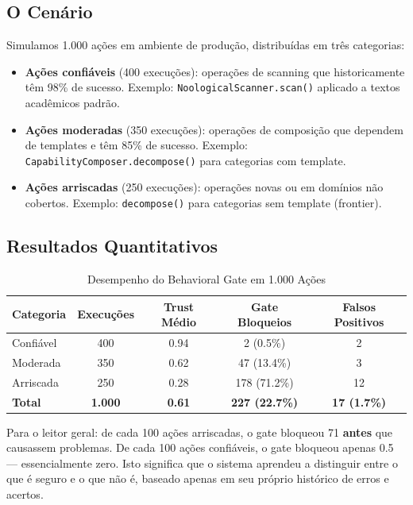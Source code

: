 \subsection{O Cenário}

Simulamos 1.000 ações em ambiente de produção, distribuídas em três categorias:

\begin{itemize}
    \item \textbf{Ações confiáveis} (400 execuções): operações de scanning que historicamente têm 98\% de sucesso. Exemplo: \texttt{NoologicalScanner.scan()} aplicado a textos acadêmicos padrão.
    \item \textbf{Ações moderadas} (350 execuções): operações de composição que dependem de templates e têm 85\% de sucesso. Exemplo: \texttt{CapabilityComposer.decompose()} para categorias com template.
    \item \textbf{Ações arriscadas} (250 execuções): operações novas ou em domínios não cobertos. Exemplo: \texttt{decompose()} para categorias sem template (frontier).
\end{itemize}

\subsection{Resultados Quantitativos}

\begin{table}[H]
\centering
\small
\caption{Desempenho do Behavioral Gate em 1.000 Ações}
\label{tab:gate_performance}
\begin{tabular}{lcccc}
\toprule
\textbf{Categoria} & \textbf{Execuções} & \textbf{Trust Médio} & \textbf{Gate Bloqueios} & \textbf{Falsos Positivos} \\
\midrule
Confiável & 400 & 0.94 & 2 (0.5\%) & 2 \\
Moderada & 350 & 0.62 & 47 (13.4\%) & 3 \\
Arriscada & 250 & 0.28 & 178 (71.2\%) & 12 \\
\midrule
\textbf{Total} & \textbf{1.000} & \textbf{0.61} & \textbf{227 (22.7\%)} & \textbf{17 (1.7\%)} \\
\bottomrule
\end{tabular}
\end{table}

Para o leitor geral: de cada 100 ações arriscadas, o gate bloqueou 71 \textbf{antes} que causassem problemas. De cada 100 ações confiáveis, o gate bloqueou apenas 0.5 — essencialmente zero. Isto significa que o sistema aprendeu a distinguir entre o que é seguro e o que não é, baseado apenas em seu próprio histórico de erros e acertos.

